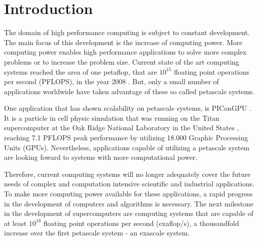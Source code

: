 \chapter{Introduction}
\label{sec:intro}



The domain of high performance computing is subject to constant
development.  The main focus of this development is the increase of
computing power.  More computing power enables high performance
applications to solve more complex problems or to increase the problem
size.  Current state of the art computing systems reached the area of
one petaflop, that are $10^{15}$ floating point operations per second
(PFLOPS), in the year 2008 \cite{ref:ibm_roadrunner}. But, only a
small number of applications worldwide have taken advantage of these
so called petascale systems.

One application that has shown scalability on petascale systems, is
PIConGPU \cite{ref:picongpu_scale}. It is a particle in cell physic
simulation that was running on the Titan supercomputer at the Oak
Ridge National Laboratory in the United States \cite{ref:titan},
reaching 7.1 PFLOPS peak performance by utilizing 18.000 Graphic
Processing Units (GPUs). Nevertheless, applications capable of
utilizing a petascale system are looking foward to systems with more
computational power.

Therefore, current computing systems will no longer adequately cover
the future needs of complex and computation intensive scientific and
industrial applications.  To make more computing power available for
these applications, a rapid progress in the development of computers
and algorithms is necessary. The next milestone in the development of
supercomputers are computing systems that are capable of at least
$10^{18}$ floating point operations per second (exaflop/s), a
thousandfold increase over the first petascale system - an exascale
system.

